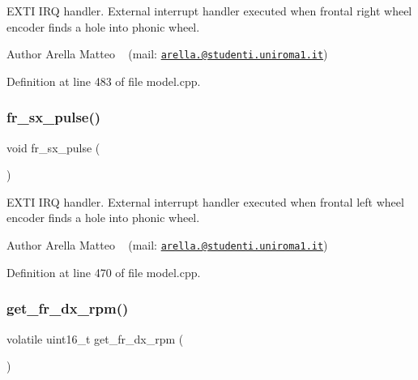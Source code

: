 E\+X\+TI I\+RQ handler. External interrupt handler executed when frontal right wheel encoder finds a hole into phonic wheel. 

\begin{DoxyAuthor}{Author}
Arella Matteo ~\newline
 (mail\+: \href{mailto:arella.1646983@studenti.uniroma1.it}{\tt arella.@studenti.\+uniroma1.\+it}) 
\end{DoxyAuthor}


Definition at line 483 of file model.\+cpp.

\mbox{\label{group___board__model__group_ga40f87aeb451c092cf21baf57defc516e}} 
\subsubsection{\texorpdfstring{fr\+\_\+sx\+\_\+pulse()}{fr\_sx\_pulse()}}
{\footnotesize\ttfamily void fr\+\_\+sx\+\_\+pulse (\begin{DoxyParamCaption}{ }\end{DoxyParamCaption})}



E\+X\+TI I\+RQ handler. External interrupt handler executed when frontal left wheel encoder finds a hole into phonic wheel. 

\begin{DoxyAuthor}{Author}
Arella Matteo ~\newline
 (mail\+: \href{mailto:arella.1646983@studenti.uniroma1.it}{\tt arella.@studenti.\+uniroma1.\+it}) 
\end{DoxyAuthor}


Definition at line 470 of file model.\+cpp.

\mbox{\label{group___board__model__group_ga3f71b1feaa9b3356080597de5de12f7b}} 
\subsubsection{\texorpdfstring{get\+\_\+fr\+\_\+dx\+\_\+rpm()}{get\_fr\_dx\_rpm()}}
{\footnotesize\ttfamily volatile uint16\+\_\+t get\+\_\+fr\+\_\+dx\+\_\+rpm (\begin{DoxyParamCaption}{ }\end{DoxyParamCaption})}



